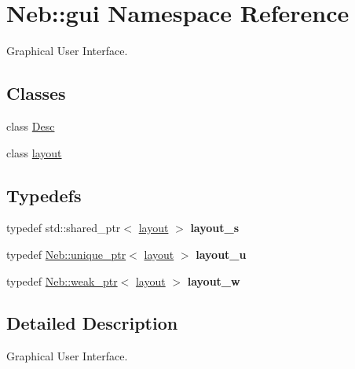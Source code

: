 \hypertarget{namespaceNeb_1_1gui}{\section{\-Neb\-:\-:gui \-Namespace \-Reference}
\label{namespaceNeb_1_1gui}
}


\-Graphical \-User \-Interface.  


\subsection*{\-Classes}
\begin{DoxyCompactItemize}
\item 
class \hyperlink{classNeb_1_1gui_1_1Desc}{\-Desc}
\item 
class \hyperlink{classNeb_1_1gui_1_1layout}{layout}
\end{DoxyCompactItemize}
\subsection*{\-Typedefs}
\begin{DoxyCompactItemize}
\item 
\hypertarget{namespaceNeb_1_1gui_ac1ad9b670a86eeef516e999fcfdac613}{typedef std\-::shared\-\_\-ptr$<$ \hyperlink{classNeb_1_1gui_1_1layout}{layout} $>$ {\bfseries layout\-\_\-s}}\label{namespaceNeb_1_1gui_ac1ad9b670a86eeef516e999fcfdac613}

\item 
\hypertarget{namespaceNeb_1_1gui_a316200f998c72b90e5c6789964840289}{typedef \hyperlink{classNeb_1_1unique__ptr}{\-Neb\-::unique\-\_\-ptr}$<$ \hyperlink{classNeb_1_1gui_1_1layout}{layout} $>$ {\bfseries layout\-\_\-u}}\label{namespaceNeb_1_1gui_a316200f998c72b90e5c6789964840289}

\item 
\hypertarget{namespaceNeb_1_1gui_a9aed3ccb6af186c3c551408314836619}{typedef \hyperlink{classNeb_1_1weak__ptr}{\-Neb\-::weak\-\_\-ptr}$<$ \hyperlink{classNeb_1_1gui_1_1layout}{layout} $>$ {\bfseries layout\-\_\-w}}\label{namespaceNeb_1_1gui_a9aed3ccb6af186c3c551408314836619}

\end{DoxyCompactItemize}


\subsection{\-Detailed \-Description}
\-Graphical \-User \-Interface. 
